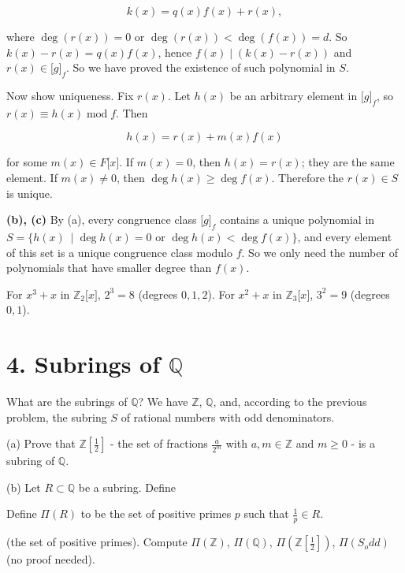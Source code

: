 \[k(x) = q(x)f(x) + r(x),\]

where \(\deg\left( {r(x)} \right) = 0\) or \(\deg\left( {r(x)} \right) < \deg\left( {f(x)} \right) = d\). So \(k(x) - r(x) = q(x)f(x)\), hence \(f(x) \mid \left( {k(x) - r(x)} \right)\) and \(r(x) \in \lbrack g\rbrack_{f}\). So we have proved the existence of such polynomial in \(S\).

Now show uniqueness. Fix \(r(x)\). Let \(h(x)\) be an arbitrary element in \(\lbrack g\rbrack_{f}\), so \(r(x) \equiv h(x)\operatorname{mod}f\). Then

\[h(x) = r(x) + m(x)f(x)\]

for some \(m(x) \in F\lbrack x\rbrack\). If \(m(x) = 0\), then \(h(x) = r(x)\); they are the same element. If \(m(x) \neq 0\), then \(\deg h(x) \geq \deg f(x)\). Therefore the \(r(x) \in S\) is unique.

\textbf{(b), (c)} By (a), every congruence class \(\lbrack g\rbrack_{f}\) contains a unique polynomial in \(\left. S = \{ h(x)\  \middle| \deg h(x) = 0 \right.\) or \(\deg h(x) < \deg f(x)\}\), and every element of this set is a unique congruence class modulo \(f\). So we only need the number of polynomials that have smaller degree than \(f(x)\).

For \(x^{3} + x\) in \(\mathbb{Z}_{2}\lbrack x\rbrack\), \(2^{3} = 8\) (degrees \(0,1,2\)). For \(x^{2} + x\) in \(\mathbb{Z}_{3}\lbrack x\rbrack\), \(3^{2} = 9\) (degrees \(0,1\)).

\section{\texorpdfstring{4. Subrings of \(\mathbb{Q}\)}{4. Subrings of \textbackslash mathbb\{Q\}}}

What are the subrings of \(\mathbb{Q}\)? We have \(\mathbb{Z}\), \(\mathbb{Q}\), and, according to the previous problem, the subring \(S\) of rational numbers with odd denominators.

(a) Prove that \(\mathbb{Z}\left\lbrack \frac{1}{2} \right\rbrack\) - the set of fractions \(\frac{a}{2^{m}}\) with \(a,m \in \mathbb{Z}\) and \(m \geq 0\) - is a subring of \(\mathbb{Q}\).

(b) Let \(R \subset \mathbb{Q}\) be a subring. Define

Define \(\Pi(R)\) to be the set of positive primes \(p\) such that \(\frac{1}{p} \in R\).

(the set of positive primes). Compute \(\Pi\left( \mathbb{Z} \right)\), \(\Pi\left( \mathbb{Q} \right)\), \(\Pi\left( {\mathbb{Z}\left\lbrack \frac{1}{2} \right\rbrack} \right)\), \(\Pi\left( {S_{o}dd} \right)\) (no proof needed).

